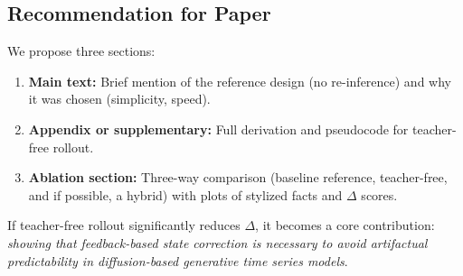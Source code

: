 \subsection{Recommendation for Paper}

We propose three sections:

\begin{enumerate}[leftmargin=*,topsep=2pt,itemsep=2pt]
  \item \textbf{Main text:} Brief mention of the reference design (no re-inference) and why it was chosen (simplicity, speed).
  \item \textbf{Appendix or supplementary:} Full derivation and pseudocode for teacher-free rollout.
  \item \textbf{Ablation section:} Three-way comparison (baseline reference, teacher-free, and if possible, a hybrid) with plots of stylized facts and $\Delta$ scores.
\end{enumerate}

If teacher-free rollout significantly reduces $\Delta$, it becomes a core contribution: \emph{showing that feedback-based state correction is necessary to avoid artifactual predictability in diffusion-based generative time series models}.
